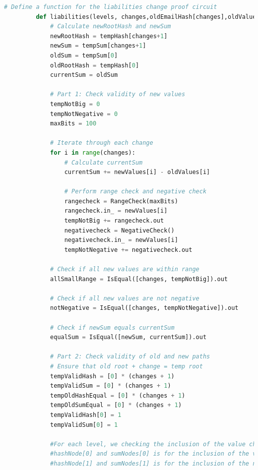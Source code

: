        \begin{lstlisting}[language=Python, caption=Liabilities change circuit pseudocode]
         # Define a function for the liabilities change proof circuit
         def liabilities(levels, changes,oldEmailHash[changes],oldValues[changes],newEmailHash[changes],newValues[changes],tempHash[changes+1],tempSum[changes+1],neighborsSum[changes][levels],neighborsHash[changes][levels],neighborsBinary[changes][levels]):         
             # Calculate newRootHash and newSum
             newRootHash = tempHash[changes+1]
             newSum = tempSum[changes+1]
             oldSum = tempSum[0]
             oldRootHash = tempHash[0]
             currentSum = oldSum
         
             # Part 1: Check validity of new values
             tempNotBig = 0
             tempNotNegative = 0
             maxBits = 100
         
             # Iterate through each change
             for i in range(changes):
                 # Calculate currentSum
                 currentSum += newValues[i] - oldValues[i]
         
                 # Perform range check and negative check
                 rangecheck = RangeCheck(maxBits)
                 rangecheck.in_ = newValues[i]
                 tempNotBig += rangecheck.out
                 negativecheck = NegativeCheck()
                 negativecheck.in_ = newValues[i]
                 tempNotNegative += negativecheck.out
         
             # Check if all new values are within range
             allSmallRange = IsEqual([changes, tempNotBig]).out
         
             # Check if all new values are not negative
             notNegative = IsEqual([changes, tempNotNegative]).out
         
             # Check if newSum equals currentSum
             equalSum = IsEqual([newSum, currentSum]).out
         
             # Part 2: Check validity of old and new paths
             # Ensure that old root + change = temp root
             tempValidHash = [0] * (changes + 1)
             tempValidSum = [0] * (changes + 1)
             tempOldHashEqual = [0] * (changes + 1)
             tempOldSumEqual = [0] * (changes + 1)
             tempValidHash[0] = 1
             tempValidSum[0] = 1
         
             #For each level, we checking the inclusion of the value changing, and the new value.
             #hashNode[0] and sumNodes[0] is for the inclusion of the value changing
             #hashNode[1] and sumNodes[1] is for the inclusion of the new value


\end{lstlisting}
